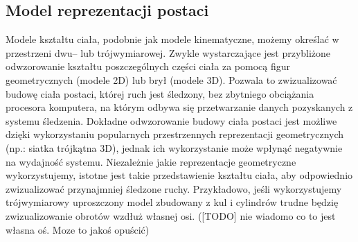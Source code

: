 \subsection{Model reprezentacji postaci}
Modele kształtu ciała, podobnie jak modele kinematyczne, możemy określać w przestrzeni dwu-- lub trójwymiarowej. Zwykle wystarczające jest przybliżone odwzorowanie kształtu poszczególnych części ciała za pomocą figur geometrycznych (modele 2D) lub brył (modele 3D). Pozwala to zwizualizować budowę ciała postaci, której ruch jest śledzony, bez zbytniego obciążania procesora komputera, na którym odbywa się przetwarzanie danych pozyskanych z systemu śledzenia. Dokładne odwzorowanie budowy ciała postaci jest możliwe dzięki wykorzystaniu popularnych przestrzennych reprezentacji geometrycznych (np.: siatka trójkątna 3D), jednak ich wykorzystanie może wpłynąć negatywnie na wydajność systemu. 
Niezależnie jakie reprezentacje geometryczne wykorzystujemy, istotne jest takie przedstawienie kształtu ciała, aby odpowiednio zwizualizować przynajmniej śledzone ruchy. Przykładowo, jeśli wykorzystujemy trójwymiarowy uproszczony model zbudowany z kul i cylindrów trudne będzię zwizualizowanie obrotów wzdłuż własnej osi. ([TODO] nie wiadomo co to jest własna oś. Moze to jakoś opuścić)\\

